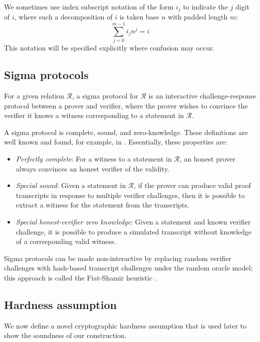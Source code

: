 \documentclass{article}
\theoremstyle{definition}
\begin{document}
We sometimes use index subscript notation of the form $i_j$ to indicate the $j$ digit of $i$, where such a decomposition of $i$ is taken base $n$ with padded length $m$:
$$\sum_{j=0}^{m-1} i_j n^j = i$$
This notation will be specified explicitly where confusion may occur.


\subsection{Sigma protocols}
For a given relation $\mathcal{R}$, a sigma protocol for $\mathcal{R}$ is an interactive challenge-response protocol between a prover and verifier, where the prover wishes to convince the verifier it knows a witness corresponding to a statement in $\mathcal{R}$.

A sigma protocol is complete, sound, and zero-knowledge.
These definitions are well known and found, for example, in \cite{groth}.
Essentially, these properties are:
\begin{itemize}
\item \textit{Perfectly complete}: For a witness to a statement in $\mathcal{R}$, an honest prover always convinces an honest verifier of the validity.
\item \textit{Special sound}: Given a statement in $\mathcal{R}$, if the prover can produce valid proof transcripts in response to multiple verifier challenges, then it is possible to extract a witness for the statement from the transcripts.
\item \textit{Special honest-verifier zero knowledge}: Given a statement and known verifier challenge, it is possible to produce a simulated transcript without knowledge of a corresponding valid witness.
\end{itemize}
Sigma protocols can be made non-interactive by replacing random verifier challenges with hash-based transcript challenges under the random oracle model; this approach is called the Fiat-Shamir heuristic \cite{fiat}.


\subsection{Hardness assumption}
We now define a novel cryptographic hardness assumption that is used later to show the soundness of our construction.
\end{document}
